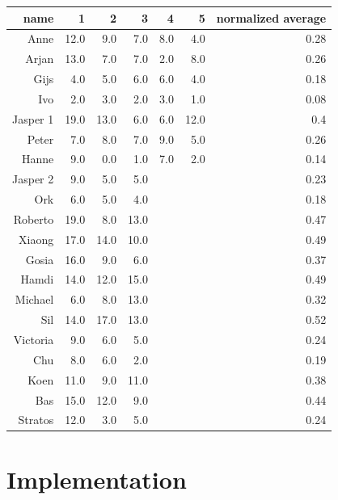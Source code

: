 \begin{tabular}{rrrrrrr}
\hline
name	& 1 & 2 & 3 & 4 & 5 & normalized average \\
\hline
Anne	&	12.0	&	9.0		&	7.0	&	8.0	&	4.0	&	0.28\\
Arjan	&	13.0	&	7.0		&	7.0	&	2.0	&	8.0	&	0.26\\
Gijs	&	4.0		&	5.0		&	6.0	&	6.0	&	4.0	&	0.18\\
Ivo		&	2.0		&	3.0		&	2.0	&	3.0	&	1.0	&	0.08\\
Jasper 1	&	19.0	&	13.0	&	6.0	&	6.0	&	12.0 &	0.4\\
Peter	&	7.0		&	8.0		&	7.0	&	9.0	&	5.0	&	0.26\\
Hanne	&	9.0		&	0.0		&	1.0	&	7.0	&	2.0	&	0.14\\
Jasper 2	&	9.0		&	5.0		&	5.0 & & & 0.23\\
Ork		&	6.0		&	5.0		&	4.0	& & & 0.18\\
Roberto	&	19.0	&	8.0		&	13.0 & & & 0.47\\
Xiaong	&	17.0	&	14.0	&	10.0 & & & 0.49\\
\hline
Gosia	&	16.0	&	9.0		&	6.0 & & & 0.37\\
Hamdi	&	14.0	&	12.0	&	15.0 & & & 0.49\\
Michael	&	6.0		&	8.0		&	13.0 & & & 0.32\\
Sil		&	14.0	&	17.0	&	13.0 & & & 0.52\\
Victoria	&	9.0	&	6.0		&	5.0 & & & 0.24\\
Chu		&	8.0		&	6.0		&	2.0 & & & 0.19\\
\hline
Koen	&	11.0	&	9.0		&	11.0 & & & 0.38\\
Bas		&	15.0	&	12.0	&	9.0 & & & 0.44\\
Stratos	&	12.0	&	3.0		&	5.0 & & & 0.24\\

\hline
\end{tabular}






\section{Implementation}

